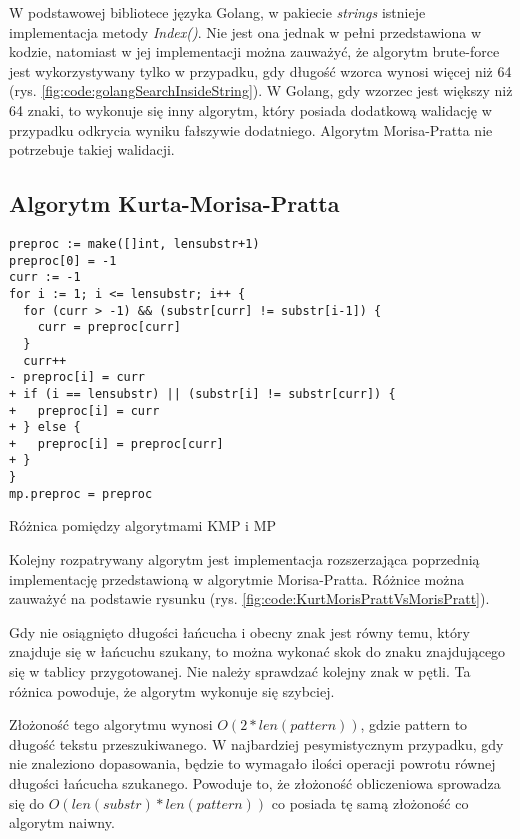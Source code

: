 W podstawowej bibliotece języka Golang, w pakiecie \textit{strings} istnieje 
implementacja metody \textit{Index()}. Nie jest ona jednak w pełni przedstawiona
w kodzie, natomiast w jej implementacji można zauważyć, że algorytm brute-force
jest wykorzystywany tylko w przypadku, gdy długość wzorca wynosi więcej niż 64 
(rys. \ref{fig:code:golangSearchInsideString}). W Golang, gdy wzorzec jest większy niż
64 znaki, to wykonuje się inny algorytm, który posiada dodatkową walidację w
przypadku odkrycia wyniku fałszywie dodatniego. Algorytm Morisa-Pratta nie
 potrzebuje takiej walidacji.

\subsection{Algorytm Kurta-Morisa-Pratta}

\begin{listing}[H]
    \begin{verbatim}
preproc := make([]int, lensubstr+1)
preproc[0] = -1
curr := -1
for i := 1; i <= lensubstr; i++ {
  for (curr > -1) && (substr[curr] != substr[i-1]) {
    curr = preproc[curr]
  }
  curr++
- preproc[i] = curr
+ if (i == lensubstr) || (substr[i] != substr[curr]) {
+   preproc[i] = curr
+ } else {
+   preproc[i] = preproc[curr]
+ }
}
mp.preproc = preproc
    \end{verbatim}
  \caption{Różnica pomiędzy algorytmami KMP i MP}
  \label{fig:code:KurtMorisPrattVsMorisPratt}
\end{listing}

Kolejny rozpatrywany algorytm jest implementacja rozszerzająca poprzednią 
implementację przedstawioną w algorytmie Morisa-Pratta. Różnice można zauważyć na podstawie rysunku
(rys. \ref{fig:code:KurtMorisPrattVsMorisPratt}).

Gdy nie osiągnięto długości łańcucha i obecny znak jest równy temu, który 
znajduje się w łańcuchu szukany, to można wykonać skok do znaku znajdującego
się w tablicy przygotowanej. Nie należy sprawdzać kolejny znak w pętli. Ta różnica
powoduje, że algorytm wykonuje się szybciej.

Złożoność tego algorytmu wynosi $O(2*{len(pattern)})$, gdzie pattern to długość
tekstu przeszukiwanego. W najbardziej pesymistycznym przypadku, gdy nie 
znaleziono dopasowania, będzie to wymagało ilości operacji powrotu równej długości 
łańcucha szukanego. Powoduje to, że złożoność obliczeniowa sprowadza się do
$O({len(substr)}*{len(pattern)})$ co posiada tę samą złożoność co algorytm naiwny. 


